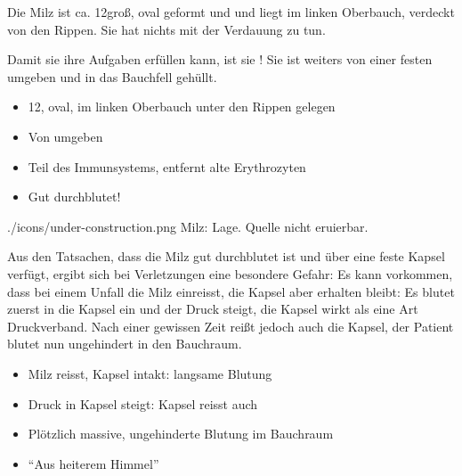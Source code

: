 {
Die Milz ist ca. 12\CM* groß, oval geformt und und liegt im
linken Oberbauch, verdeckt von den Rippen. Sie hat nichts 
mit der Verdauung  zu tun.

 Damit sie ihre Aufgaben erfüllen
kann, ist sie ! 
Sie ist weiters von einer festen 
umgeben und in das Bauchfell gehüllt.
}
{
\begin{itemize}
  \item 12\CM*, oval, im linken Oberbauch unter den Rippen gelegen
  \item Von  umgeben
  \item Teil des Immunsystems, entfernt alte Erythrozyten
  \item Gut durchblutet!
\end{itemize}
}
{./icons/under-construction.png}
{Milz:
Lage.}
{Quelle nicht eruierbar.}
 
{%
%
%
Aus den Tatsachen, dass die Milz gut durchblutet ist und
über eine feste Kapsel verfügt, ergibt sich bei Verletzungen
eine besondere Gefahr:
Es kann vorkommen, dass bei einem Unfall die Milz einreisst,
die Kapsel aber erhalten bleibt: Es blutet zuerst in die
Kapsel ein und der Druck steigt, die Kapsel wirkt als eine
Art Druckverband. Nach einer gewissen Zeit reißt jedoch auch
die Kapsel, der Patient blutet nun  ungehindert
in den Bauchraum.   }{%
\begin{itemize}
  \item Milz reisst, Kapsel intakt: langsame Blutung
  \item Druck in Kapsel steigt: Kapsel reisst auch
  \item Plötzlich massive, ungehinderte Blutung im Bauchraum
  \item \protect\enquote{Aus heiterem Himmel}
\end{itemize}
}{}{}{}


